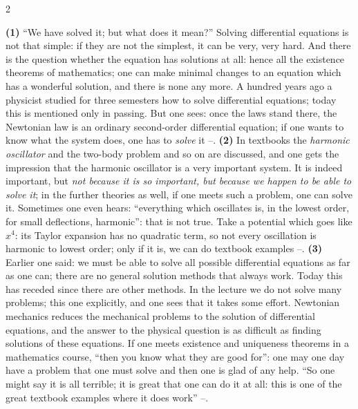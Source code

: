 \begin{paracol}{2}
\begin{coursenote}\label{cn:tb-ode}
\textbf{(1)} ``We have solved it; but what does it mean?'' Solving differential equations is not that simple: if they are not the simplest, it can be very, very hard. And there is the question whether the equation has solutions at all: hence all the existence theorems of mathematics; one can make minimal changes to an equation which has a wonderful solution, and there is none any more. A hundred years ago a physicist studied for three semesters how to solve differential equations; today this is mentioned only in passing.
But one sees: once the laws stand there, the Newtonian law is an ordinary second-order differential equation; if one wants to know what the system does, one has to \emph{solve} it --.
\textbf{(2)} In textbooks the \emph{harmonic oscillator} and the two-body problem and so on are discussed, and one gets the impression that the harmonic oscillator is a very important system. It is indeed important, but \emph{not because it is so important, but because we happen to be able to solve it}; in the further theories as well, if one meets such a problem, one can solve it. Sometimes one even hears: ``everything which oscillates is, in the lowest order, for small deflections, harmonic'': that is not true.
Take a potential which goes like $x^4$: its Taylor expansion has no quadratic term, so not every oscillation is harmonic to lowest order; only if it is, we can do textbook examples --.
\textbf{(3)} Earlier one said: we must be able to solve all possible differential equations as far as one can; there are no general solution methods that always work. Today this has receded since there are other methods. In the lecture we do not solve many problems; this one explicitly, and one sees that it takes some effort. Newtonian mechanics reduces the mechanical problems to the solution of differential equations, and the answer to the physical question is as difficult as finding solutions of these equations.
If one meets existence and uniqueness theorems in a mathematics course, ``then you know what they are good for'': one may one day have a problem that one must solve and then one is glad of any help. ``So one might say it is all terrible; it is great that one can do it at all: this is one of the great textbook examples where it does work'' --.
\end{coursenote}


\end{paracol}
